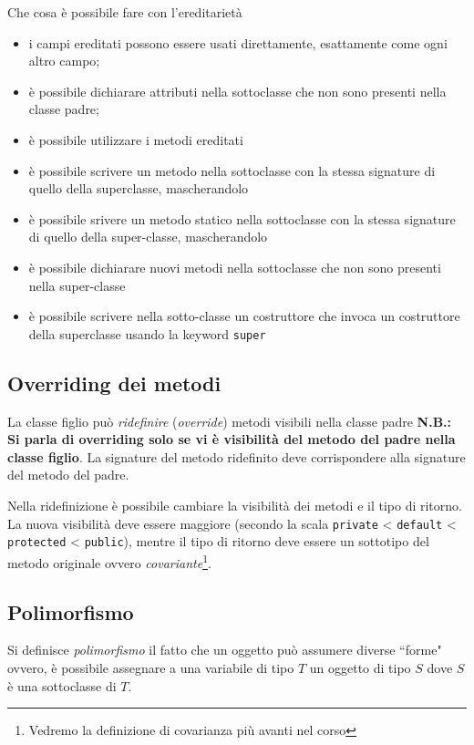 \documentclass{article}
\begin{document}
Che cosa \`e possibile fare con l'ereditariet\`a
\begin{itemize}
\item i campi ereditati possono essere usati direttamente, esattamente come ogni altro campo;
\item \`e possibile dichiarare attributi nella sottoclasse che non sono presenti nella classe padre;
\item \`e possibile utilizzare i metodi ereditati
\item \`e possibile scrivere un metodo nella sottoclasse con la stessa signature di quello della superclasse, mascherandolo
\item \`e possibile srivere un metodo statico nella sottoclasse con la stessa signature di quello della super-classe, mascherandolo
\item \`e possibile dichiarare nuovi metodi nella sottoclasse che non sono presenti nella super-classe
\item \`e possibile scrivere nella sotto-classe un costruttore che invoca un costruttore della superclasse usando la keyword \texttt{super}
\end{itemize}


\subsection{Overriding dei metodi}
La classe figlio può \emph{ridefinire} (\emph{override}) metodi visibili nella classe padre
\textbf{N.B.: Si parla di overriding solo se vi è visibilit\`a del metodo del padre nella classe figlio}.
La signature del metodo ridefinito deve corrispondere alla signature del metodo del padre.

Nella ridefinizione è possibile cambiare la visibilità dei metodi e il tipo di ritorno.
La nuova visibilità deve essere maggiore (secondo la scala \texttt{private} < \texttt{default} < \texttt{protected} < \texttt{public}), mentre il tipo di ritorno deve essere un sottotipo del metodo
originale ovvero \emph{covariante}\footnote{Vedremo la definizione di covarianza pi\`u avanti nel corso}.


\subsection{Polimorfismo}

Si definisce \emph{polimorfismo} il fatto che un oggetto pu\`o assumere diverse ``forme" ovvero, \`e possibile assegnare a una variabile di tipo $T$ un oggetto di tipo $S$ dove $S$ \`e una sottoclasse di $T$.
\end{document}
